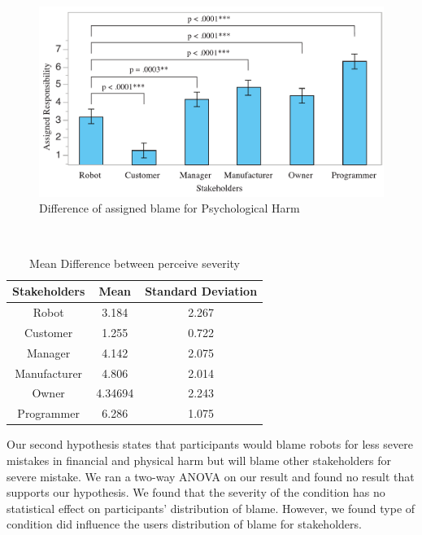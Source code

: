 \documentclass{sigchi}
\begin{document}
\begin{figure}[!h]
\centering
\includegraphics[width=1.0\columnwidth]{psychologicalGraph}
\caption{Difference of assigned blame for Psychological Harm}
\label{fig:figure5}
\end{figure}

\hspace{1 mm} \\
\begin{table}[h]
  \centering
  \begin{tabular}{ccc}
    Stakeholders & Mean & Standard Deviation\\
    \hline
    Robot & 3.184 & 2.267\\
    Customer & 1.255 & 0.722\\
    Manager & 4.142 & 2.075 \\
    Manufacturer & 4.806 & 2.014 \\
    Owner & 4.34694 & 2.243 \\
    Programmer & 6.286 & 1.075 \\
    \hline
  \end{tabular}
  \caption{Mean Difference between perceive severity}
  \label{tab:table2}
\end{table}

Our second hypothesis states that participants would blame robots for less severe mistakes in financial and physical harm but will blame other stakeholders for severe mistake. We ran a two-way ANOVA on our result and found no result that supports our hypothesis. We found that the severity of the condition has no statistical effect on participants' distribution of blame. However, we found type of condition did influence the users distribution of blame for stakeholders. 


\end{document}
